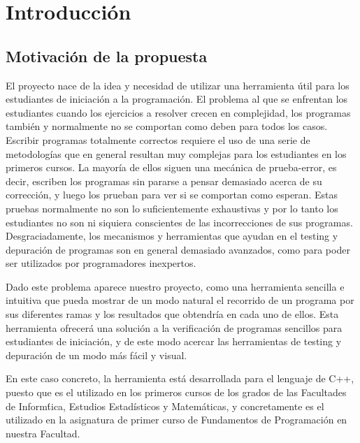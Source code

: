 %
%

\chapter{Introducci\'on}

\section{Motivaci\'on de la propuesta}

El proyecto nace de la idea y necesidad de utilizar una herramienta \'util para los estudiantes de iniciaci\'on a la programaci\'on. El problema al que se enfrentan los estudiantes cuando los ejercicios a resolver crecen en complejidad, los programas tambi\'en y normalmente no se comportan como deben para todos los casos. Escribir programas totalmente correctos requiere el uso de una serie de metodolog\'ias que en general resultan muy complejas para los estudiantes en los primeros cursos. La mayor\'ia de ellos siguen una mec\'anica de prueba-error, es decir, escriben los programas sin pararse a pensar demasiado acerca de su correcci\'on, y luego los prueban para ver si se comportan como esperan. Estas pruebas normalmente no son lo suficientemente exhaustivas y por lo tanto los estudiantes no son ni siquiera conscientes de las incorrecciones de sus programas. Desgraciadamente, los mecanismos y herramientas que ayudan en el testing y depuraci\'on de programas son en general demasiado avanzados, como para poder ser utilizados por programadores inexpertos.

Dado este problema aparece nuestro proyecto, como una herramienta sencilla e intuitiva que pueda mostrar de un modo natural el recorrido de un programa por sus diferentes ramas y los resultados que obtendr\'ia en cada uno de ellos. Esta herramienta ofrecer\'a una soluci\'on a la verificaci\'on de programas sencillos para estudiantes de iniciaci\'on, y de este modo acercar las herramientas de testing y depuraci\'on de un modo m\'as f\'acil y visual.

En este caso concreto, la herramienta est\'a desarrollada para el lenguaje de C++, puesto que es el utilizado en los primeros cursos de los grados de las Facultades de Inform\'tica, Estudios Estad\'isticos y Matem\'aticas, y concretamente es el utilizado en la asignatura de primer curso de Fundamentos de Programaci\'on en nuestra Facultad.

